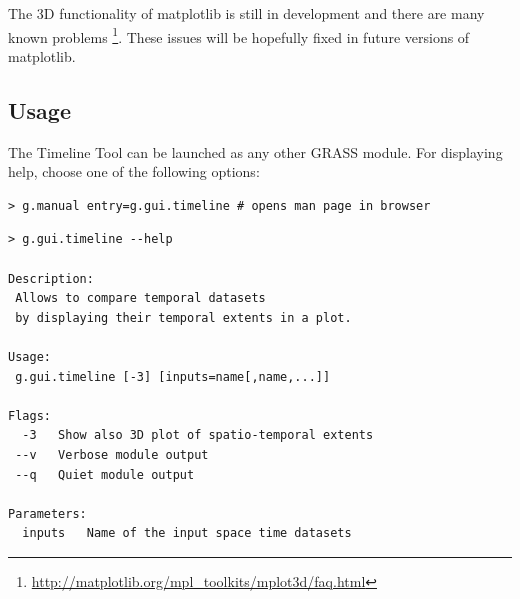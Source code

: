 \documentclass[a4paper,12pt,oneside]{book}
\begin{document}
The 3D functionality of matplotlib is still in development and there are many known problems%
\footnote{\url{http://matplotlib.org/mpl_toolkits/mplot3d/faq.html}}.
These issues will be hopefully fixed in future versions of matplotlib.


\subsection{Usage}
The Timeline Tool can be launched as any other GRASS module.
For displaying help, choose one of the following options:
\begin{small}
\begin{lstlisting}[style=mybash]
> g.manual entry=g.gui.timeline # opens man page in browser
\end{lstlisting}
\end{small}

\begin{small}
\begin{lstlisting}[style=mybash]
> g.gui.timeline --help

Description:
 Allows to compare temporal datasets
 by displaying their temporal extents in a plot.

Usage:
 g.gui.timeline [-3] [inputs=name[,name,...]]

Flags:
  -3   Show also 3D plot of spatio-temporal extents
 --v   Verbose module output
 --q   Quiet module output

Parameters:
  inputs   Name of the input space time datasets

\end{lstlisting}
\end{small}
\end{document}
